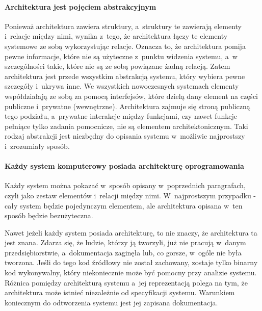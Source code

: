 \paragraph{Architektura jest pojęciem abstrakcyjnym\newline\newline}
Ponieważ architektura zawiera struktury, a~struktury te zawierają elementy i~relacje między nimi, wynika z~tego, że architektura łączy te elementy systemowe ze sobą wykorzystując relacje. Oznacza to, że architektura pomija pewne informacje, które nie są użyteczne z~punktu widzenia systemu, a~w szczególności takie, które nie są ze sobą powiązane żadną relacją. Zatem architektura jest przede wszystkim abstrakcją systemu, który wybiera pewne szczegóły i~ukrywa inne. We wszystkich nowoczesnych systemach elementy współdziałają ze sobą za pomocą interfejsów, które dzielą dany element na części publiczne i~prywatne (wewnętrzne). Architektura zajmuje się stroną publiczną tego podziału, a~prywatne interakcje między funkcjami, czy nawet funkcje pełniące tylko zadania pomocnicze, nie są elementem architektonicznym. Taki rodzaj abstrakcji jest niezbędny do opisania systemu w~możliwie najprostszy i~zrozumiały sposób.

\paragraph{Każdy system komputerowy posiada architekturę oprogramowania\newline\newline}
Każdy system można pokazać w~sposób opisany w~poprzednich paragrafach, czyli jako zestaw elementów i~relacji między nimi. W~najprostszym przypadku - cały system będzie pojedynczym elementem, ale architektura opisana w~ten sposób będzie bezużyteczna.

Nawet jeżeli każdy system posiada architekturę, to nie znaczy, że architektura ta jest znana. Zdarza się, że ludzie, którzy ją tworzyli, już nie pracują w~danym przedsiębiorstwie, a~dokumentacja zaginęła lub, co gorsze, w~ogóle nie była tworzona. Jeśli do tego kod źródłowy nie został zachowany, zostaje tylko binarny kod wykonywalny, który niekoniecznie może być pomocny przy analizie systemu.
Różnica pomiędzy architekturą systemu a~jej reprezentacją polega na tym, że architektura może istnieć niezależnie od specyfikacji systemu.  Warunkiem koniecznym do odtworzenia systemu jest jej zapisana dokumentacja.

